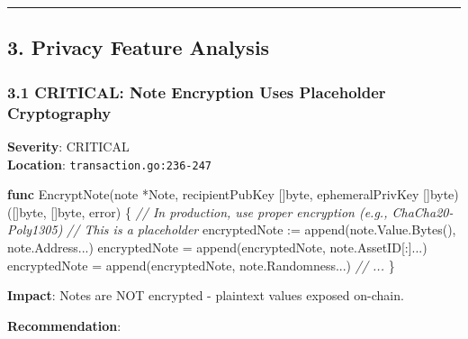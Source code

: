 \documentclass[
]{article}
\newenvironment{Shaded}{}{}
\newcommand{\BuiltInTok}[1]{\textcolor[rgb]{0.00,0.50,0.00}{#1}}
\newcommand{\CommentTok}[1]{\textcolor[rgb]{0.38,0.63,0.69}{\textit{#1}}}
\newcommand{\DataTypeTok}[1]{\textcolor[rgb]{0.56,0.13,0.00}{#1}}
\newcommand{\KeywordTok}[1]{\textcolor[rgb]{0.00,0.44,0.13}{\textbf{#1}}}
\newcommand{\NormalTok}[1]{#1}
\newcommand{\OperatorTok}[1]{\textcolor[rgb]{0.40,0.40,0.40}{#1}}
\begin{document}
\begin{center}\rule{0.5\linewidth}{0.5pt}\end{center}

\subsection{3. Privacy Feature
Analysis}\label{3-privacy-feature-analysis}

\subsubsection{3.1 CRITICAL: Note Encryption Uses Placeholder
Cryptography}\label{31-critical-note-encryption-uses-placeholder-cryptography}

\textbf{Severity}: CRITICAL\\
\textbf{Location}: \texttt{transaction.go:236-247}

\begin{Shaded}
\begin{Highlighting}[]
\KeywordTok{func}\NormalTok{ EncryptNote}\OperatorTok{(}\NormalTok{note }\OperatorTok{*}\NormalTok{Note}\OperatorTok{,}\NormalTok{ recipientPubKey }\OperatorTok{[]}\DataTypeTok{byte}\OperatorTok{,}\NormalTok{ ephemeralPrivKey }\OperatorTok{[]}\DataTypeTok{byte}\OperatorTok{)} \OperatorTok{([]}\DataTypeTok{byte}\OperatorTok{,} \OperatorTok{[]}\DataTypeTok{byte}\OperatorTok{,} \DataTypeTok{error}\OperatorTok{)} \OperatorTok{\{}
    \CommentTok{// In production, use proper encryption (e.g., ChaCha20{-}Poly1305)}
    \CommentTok{// This is a placeholder}
\NormalTok{    encryptedNote }\OperatorTok{:=} \BuiltInTok{append}\OperatorTok{(}\NormalTok{note}\OperatorTok{.}\NormalTok{Value}\OperatorTok{.}\NormalTok{Bytes}\OperatorTok{(),}\NormalTok{ note}\OperatorTok{.}\NormalTok{Address}\OperatorTok{...)}
\NormalTok{    encryptedNote }\OperatorTok{=} \BuiltInTok{append}\OperatorTok{(}\NormalTok{encryptedNote}\OperatorTok{,}\NormalTok{ note}\OperatorTok{.}\NormalTok{AssetID}\OperatorTok{[:]...)}
\NormalTok{    encryptedNote }\OperatorTok{=} \BuiltInTok{append}\OperatorTok{(}\NormalTok{encryptedNote}\OperatorTok{,}\NormalTok{ note}\OperatorTok{.}\NormalTok{Randomness}\OperatorTok{...)}
    \CommentTok{// ...}
\OperatorTok{\}}
\end{Highlighting}
\end{Shaded}

\textbf{Impact}: Notes are NOT encrypted - plaintext values exposed
on-chain.

\textbf{Recommendation}:
\end{document}
